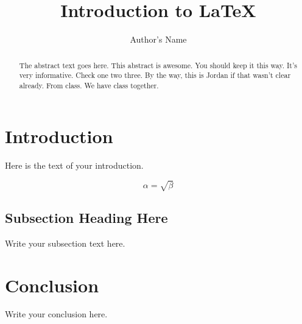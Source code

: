 \documentclass{article}
\begin{document}
\title{Introduction to \LaTeX{}}
\author{Author's Name}

\maketitle

\begin{abstract}
The abstract text goes here. This abstract is awesome. You should keep it this way. It's very informative. Check one two three. By the way, this is Jordan if that wasn't clear already. From class. We have class together.
\end{abstract}

\section{Introduction}
Here is the text of your introduction.

\begin{equation}
    \label{simple_equation}
    \alpha = \sqrt{ \beta }
\end{equation}

\subsection{Subsection Heading Here}
Write your subsection text here.

\section{Conclusion}
Write your conclusion here.
\end{document}
